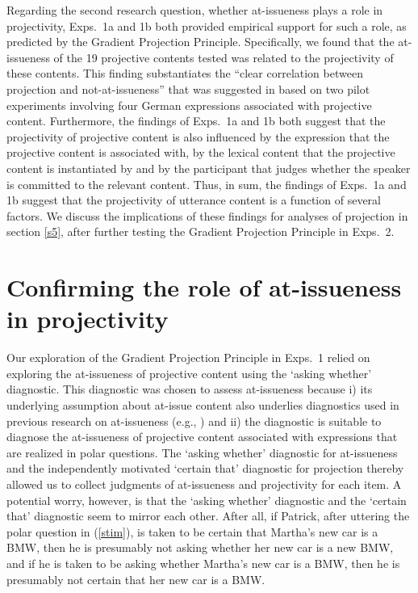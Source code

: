 \documentclass[11pt,fleqn]{article}
\newcommand{\6}{\mbox{$[\hspace*{-.6mm}[$}}
\newcommand{\9}{\mbox{$]\hspace*{-.6mm}]$}}
\begin{document}
Regarding the second research question, whether at-issueness plays a role in projectivity, Exps.~1a and 1b both provided empirical support for such a role, as predicted by  the Gradient Projection Principle. Specifically, we found that the at-issueness  of the 19 projective contents tested was related to the projectivity of these contents. This finding substantiates the ``clear correlation between projection and not-at-issueness'' that was suggested in \citealt[180]{xue-onea11} based on two pilot experiments involving four German expressions associated with projective content. Furthermore, the findings of Exps.~1a and 1b both suggest that the projectivity of projective content is also influenced by the expression that the projective content is associated with, by the lexical content that the projective content is instantiated by and by the participant that judges  whether the speaker is committed to the relevant content.  Thus, in sum, the findings of Exps.~1a and 1b suggest that the projectivity of utterance content is a function of several factors. We discuss the implications of these findings for analyses of projection in section \ref{s5}, after further testing the Gradient Projection Principle in Exps.~2.

\section{Confirming the role of at-issueness in projectivity}\label{s4}


Our exploration of the Gradient Projection Principle in Exps.~1 relied on exploring the at-issueness of projective content using the `asking whether' diagnostic. This diagnostic was chosen to assess at-issueness because i) its underlying assumption about at-issue content also underlies diagnostics used in previous research on at-issueness (e.g., \citealt{amaral-etal07,tonhauser-sula6}) and ii) the diagnostic is suitable to diagnose the at-issueness of projective content associated with expressions that are realized in polar questions. The `asking whether' diagnostic for at-issueness and the independently motivated `certain that' diagnostic for projection thereby allowed us to collect judgments of at-issueness and projectivity for each item. A potential worry, however, is that the `asking whether' diagnostic and the `certain that'  diagnostic seem to mirror each other. After all, if Patrick, after uttering the polar question in (\ref{stim}), is taken to be certain that Martha's new car is a BMW, then he is presumably not asking whether her new car is a new BMW, and if he is taken to be asking whether Martha's new car is a BMW, then he is presumably not certain that her new car is a BMW.
\end{document}
